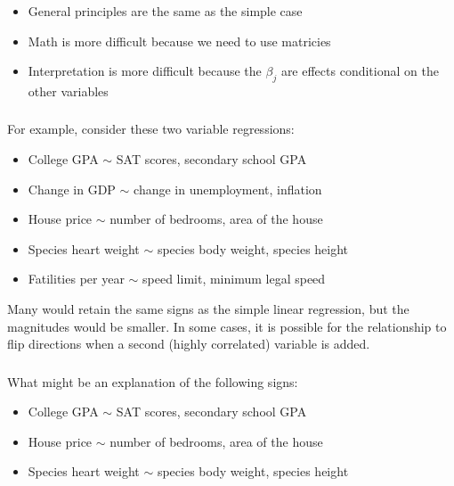 \begin{frame}[fragile] \frametitle{}


\begin{itemize}
\item General principles are the same as the simple case \pause
\item Math is more difficult because we need to use matricies \pause
\item Interpretation is more difficult because the $\beta_j$ are effects
conditional on the other variables
\end{itemize}

\end{frame}


\begin{frame}[fragile] \frametitle{}

For example, consider these two variable regressions:
\begin{itemize}
\item College GPA $\sim$ SAT scores, secondary school GPA
\item Change in GDP $\sim$ change in unemployment, inflation
\item House price $\sim$ number of bedrooms, area of the house
\item Species heart weight $\sim$ species body weight, species height
\item Fatilities per year $\sim$ speed limit, minimum legal speed
\end{itemize}

\pause
Many would retain the same signs as the simple linear regression, but
the magnitudes would be smaller. In some cases, it is possible for
the relationship to flip directions when a second (highly correlated)
variable is added.

\end{frame}

\begin{frame}[fragile] \frametitle{}

What might be an explanation of the following signs:
\begin{itemize}
\item College GPA $\sim$ {\color{solarized@red} SAT scores}, {\color{solarized@green} secondary school GPA} \pause
\item House price $\sim$ {\color{solarized@green} number of bedrooms},
      {\color{solarized@red} area of the house} \pause
\item Species heart weight $\sim$ {\color{solarized@green} species body weight}, {\color{solarized@red} species height}
\end{itemize}

\end{frame}


